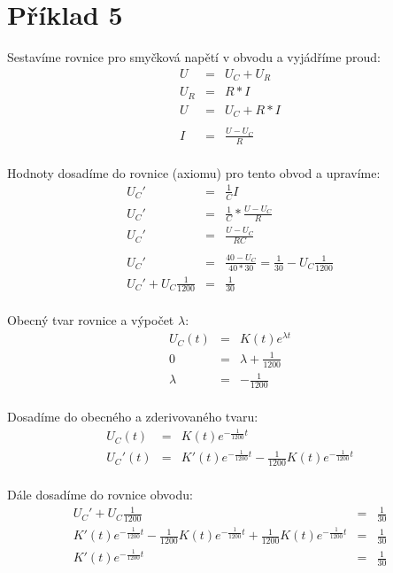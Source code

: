 \section{Příklad 5}

Sestavíme rovnice pro smyčková napětí v obvodu a vyjádříme proud:
    \begin{eqnarray*}
        U &= & U_{C} + U_{R}\\
        U_{R} &= & R * I\\
        U &= & U_{C} + R * I\\
        \\
        I &= & \frac{U - U_{C}}{R}\\
	\end{eqnarray*}

Hodnoty dosadíme do rovnice (axiomu) pro tento obvod a upravíme:
    \begin{eqnarray*}
        U_{C}' &= & \frac{1}{C}I\\
        U_{C}' &= & \frac{1}{C} * \frac{U - U_{C}}{R}\\
        U_{C}' &= & \frac{U - U_{C}}{RC}\\
        \\
        U_{C}' &= & \frac{40 - U_{C}}{40 * 30} = \frac{1}{30} - U_{C}\frac{1}{1200}\\
        U_{C}' + U_{C}\frac{1}{1200} &= & \frac{1}{30}\\
	\end{eqnarray*}

Obecný tvar rovnice a výpočet $\lambda$:
    \begin{eqnarray*}
        U_{C}(t) &= & K(t)e^{\lambda t}\\
        0 &= & \lambda + \frac{1}{1200}\\
        \lambda &= & -\frac{1}{1200}\\
	\end{eqnarray*}

Dosadíme do obecného a zderivovaného tvaru:
    \begin{eqnarray*}
        U_{C}(t) &= & K(t)e^{-\frac{1}{1200}t}\\
        U_{C}'(t) &= & K'(t)e^{-\frac{1}{1200}t} -\frac{1}{1200}K(t)e^{-\frac{1}{1200}t}\\
	\end{eqnarray*}

Dále dosadíme do rovnice obvodu:
    \begin{eqnarray*}
        U_{C}' + U_{C}\frac{1}{1200} &= & \frac{1}{30}\\
        K'(t)e^{-\frac{1}{1200}t} -\frac{1}{1200}K(t)e^{-\frac{1}{1200}t} + \frac{1}{1200}K(t)e^{-\frac{1}{1200}t} &= & \frac{1}{30}\\
        K'(t)e^{-\frac{1}{1200}t} &= & \frac{1}{30}\\
	\end{eqnarray*}

